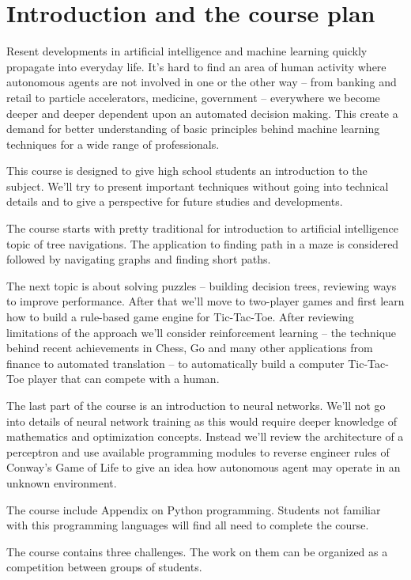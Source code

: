 \chapter{Introduction and the course plan}

Resent developments in artificial intelligence and machine
learning quickly propagate into everyday life. It's hard
to find an area of human activity where autonomous agents
are not involved in one or the other way -- from banking and retail
to particle accelerators, medicine, government -- everywhere
we become deeper and deeper dependent upon an automated
decision making. This create a demand for better understanding of
basic principles behind machine learning techniques for a wide
range of professionals. 

This course is designed to give high school students an introduction
to the subject. We'll try to present important techniques
without going into technical details and to give a perspective
for future studies and developments.

The course starts with pretty traditional for introduction
to artificial intelligence topic of tree navigations. The
application to finding path in a maze is considered followed
by navigating graphs and finding short paths.

The next topic is about solving puzzles -- building decision trees,
reviewing ways to improve performance. After that we'll move
to two-player games and first learn how to build a rule-based
game engine for Tic-Tac-Toe. After reviewing limitations of the approach
we'll consider reinforcement learning -- the technique behind
recent achievements in Chess, Go and many other applications from
finance to automated translation -- to automatically build
a computer Tic-Tac-Toe player that can compete with a human. 

The last part of the course is an introduction to neural
networks. We'll not go into details of neural network training
as this would require deeper knowledge of mathematics and
optimization concepts. Instead we'll review the architecture 
of a perceptron and use available programming modules to reverse
engineer rules of Conway's Game of Life to give an idea how
autonomous agent may operate in an unknown environment.

The course include Appendix on Python programming. Students
not familiar with this programming languages will find
all need to complete the course.

The course contains three challenges. The work on them can be organized
as a competition between groups of students. 


